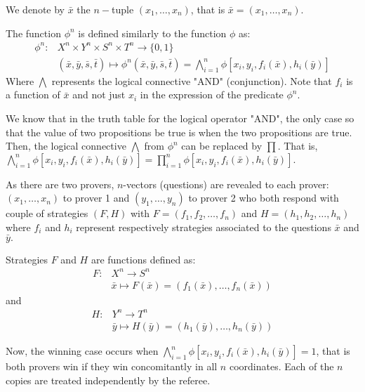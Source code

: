 We denote by  $\bar{x}$ the $n-$tuple $(x_1,\ldots, x_n)$, that is $\bar{x}=(x_1,\ldots, x_n)$. 

The function $\phi^n$ is defined similarly to the function $ \phi$ as:
\begin{align*}
\phi^n: & X^n \times Y^n \times S^n \times T^n  \longrightarrow  \{0,1\}\\ 
& (\bar{x}, \bar{y},\bar{s}, \bar{t})  \longmapsto  \phi^n(\bar{x}, \bar{y},\bar{s}, \bar{t}) = \bigwedge\limits_{i=1}^n \phi [x_i,y_i, f_i(\bar{x}), h_i(\bar{y})]
\end{align*}
Where $\bigwedge$ represents the logical connective "AND" (conjunction).
Note that $f_i$ is a function of $\bar{x}$ and not just $x_i$  in the expression of the predicate $\phi^n$.

We know that in the truth table for the logical operator "AND", the only case so that the value of two propositions be true is when the two propositions are true. Then, the logical connective $\bigwedge$ from $\phi^n$ can be replaced by $\prod.$ That is,  $\bigwedge\limits_{i=1}^n \phi [x_i,y_i, f_i(\bar{x}), h_i(\bar{y})]=\prod\limits_{i=1}^n  \phi [x_i,y_i, f_i(\bar{x}), h_i(\bar{y})].$

As there are two provers, $n$-vectors (questions) are revealed to each prover:  $(x_1, \ldots , x_n)$ to prover 1 and  $(y_1, \ldots , y_n)$ to prover 2 who both respond with  couple of strategies $(F,H)$ with $F=(f_1, f_2, \ldots, f_n)$ and $H=(h_1, h_2, \ldots, h_n)$ where $f_i$ and $h_i$ represent respectively strategies associated to the questions $\bar{x}$ and $\bar{y}.$

Strategies $F$ and $H$ are functions defined as:
 \begin{align*}
 F: & X^n \longrightarrow S^n\\
 &  \bar{x} \longmapsto F(\bar{x})=(f_1(\bar{x}), \ldots , f_n(\bar{x})) \end{align*}  and 
 \begin{align*} 
 H: & Y^n \longrightarrow T^n\\
 & \bar{y} \longmapsto H(\bar{y})=(h_1(\bar{y}), \ldots , h_n(\bar{y}))
 \end{align*}

Now, the winning case occurs when ${\bigwedge\limits_{i=1}^n \phi [x_i,y_i, f_i(\bar{x}), h_i(\bar{y})]=1}$, that is both provers win if they win concomitantly in all $n$ coordinates. Each of the $n$ copies are treated independently by the referee.

